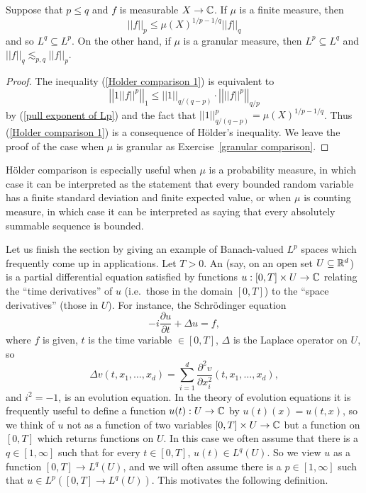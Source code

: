 \begin{corollary}\label{Holder comparison}
Suppose that $p \leq q$ and $f$ is measurable $X \to \mathbb{C}$.
If $\mu$ is a finite measure, then
\begin{equation}\label{Holder comparison 1}
||f||_{p}  \leq \mu{(X)}^{1/p-1/q} ||f||_{q}
\end{equation}
and so $L^{q} \subseteq L^{p}$.
On the other hand, if $\mu$ is a granular measure, then $L^{p} \subseteq L^{q}$ and $||f||_{q} \lesssim_{p,q} ||f||_{p} $.
\end{corollary}
\begin{proof}
The inequality (\ref{Holder comparison 1}) is equivalent to
\[\left|\left|1 ||f||^{p}\right|\right|_{1} \leq ||1||_{q/(q-p)} \cdot \left|\left| ||f||^{p}\right|\right|_{q/p}\]
by (\ref{pull exponent of Lp}) and the fact that $||1||_{q/(q-p)}^{p} = \mu{(X)}^{1/p-1/q}$.
Thus (\ref{Holder comparison 1}) is a consequence of H\"older's inequality.
We leave the proof of the case when $\mu$ is granular as Exercise~\ref{granular comparison}.
\end{proof}

H\"older comparison is especially useful when $\mu$ is a probability measure, in which case it can be interpreted as the statement that every bounded random variable has a finite standard deviation and finite expected value, or when $\mu$ is counting measure, in which case it can be interpreted as saying that every absolutely summable sequence is bounded.

Let us finish the section by giving an example of Banach-valued $L^{p}$ spaces which frequently come up in applications.
Let $T > 0$. An  (say, on an open set $U \subseteq \mathbb{R}^{d}$) is a partial differential equation satisfied by functions $u: [0, T] \times U \to \mathbb{C}$ relating the ``time derivatives'' of $u$ (i.e.\ those in the domain $[0, T]$) to the ``space derivatives'' (those in $U$).
For instance, the Schr\"odinger equation
\[-i\frac{\partial u}{\partial t} + \Delta u = f,\]
where $f$ is given, $t$ is the time variable $\in [0, T]$, $\Delta$ is the Laplace operator on $U$, so
\[\Delta v(t, x_{1}, \dots, x_{d}) = \sum_{i=1}^{d} \frac{\partial^{2} v}{\partial x_{i}^{2}} (t, x_{1}, \dots, x_{d}), \]
and $i^{2} = -1$, is an evolution equation.
In the theory of evolution equations it is frequently useful to define a function $u(t): U \to \mathbb{C}$ by $u(t)(x) = u(t, x)$, so we think of $u$ not as a function of two variables $[0, T] \times U \to \mathbb{C}$ but a function on $[0, T]$ which returns functions on $U$.
In this case we often assume that there is a $q \in [1, \infty]$ such that for every $t \in [0, T]$, $u(t) \in L^{q}(U)$.
So we view $u$ as a function $[0, T] \to L^{q}(U)$, and we will often assume there is a $p \in [1, \infty]$ such that $u \in L^{p}([0, T] \to L^{q}(U))$.
This motivates the following definition.

